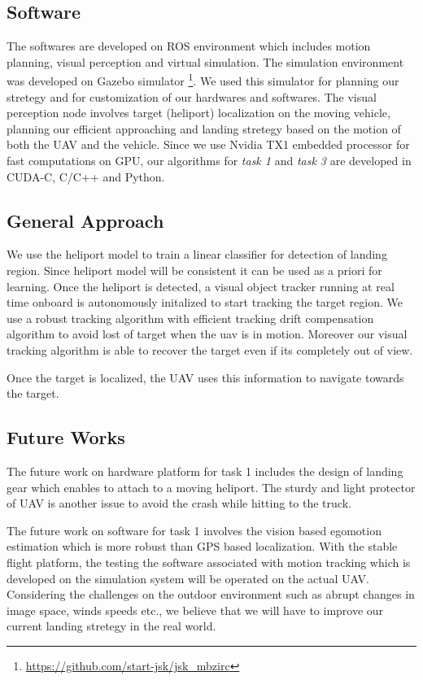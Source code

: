 \documentclass{standalone}
\begin{document}
\subsection{Software}

The softwares are developed on ROS environment which includes motion planning, visual perception and virtual simulation. The simulation environment was developed on Gazebo simulator \footnote{\url{https://github.com/start-jsk/jsk_mbzirc}}. We used this simulator for planning our stretegy and for customization of our hardwares and softwares. The visual perception node involves target (heliport) localization on the moving vehicle, planning our efficient approaching and landing stretegy based on the motion of both the UAV and the vehicle. Since we use Nvidia TX1 embedded processor for fast computations on GPU, our algorithms for \textit{task 1} and \textit{task 3} are developed in CUDA-C, C/C++ and Python. 



\subsection{General Approach}

We use the heliport model to train a linear classifier for detection of landing region. Since heliport model will be consistent it can be used as a priori for learning. Once the heliport is detected, a visual object tracker running at real time onboard is autonomously initalized to start tracking the target region. We use a robust tracking algorithm with efficient tracking drift compensation algorithm to avoid lost of target when the uav is in motion. Moreover our visual tracking algorithm is able to recover the target even if its completely out of view.

Once the target is localized, the UAV uses this information to navigate towards the target. 


\subsection{Future Works}
The future work on hardware platform for task 1 includes the design of landing gear which enables to attach to a moving heliport. The sturdy and light protector of UAV is another issue to avoid the crash while hitting to the truck.

The future work on software for task 1 involves the vision based egomotion estimation which is more robust than GPS based localization. With the stable flight platform, the testing the software associated with motion tracking which is developed on the simulation system will be operated on the actual UAV. Considering the challenges on the outdoor environment such as abrupt changes in image space, winds speeds etc., we believe that we will have to improve our current landing stretegy in the real world. 
\end{document}

